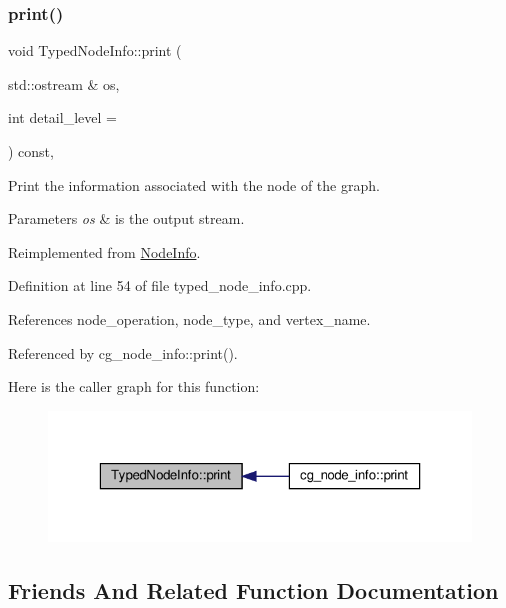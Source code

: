 \subsubsection{\texorpdfstring{print()}{print()}}
{\footnotesize\ttfamily void Typed\+Node\+Info\+::print (\begin{DoxyParamCaption}\item[{std\+::ostream \&}]{os,  }\item[{int}]{detail\+\_\+level = {} }\end{DoxyParamCaption}) const\hspace{0.3cm}{\ttfamily [override]}, {\ttfamily [virtual]}}



Print the information associated with the node of the graph. 


\begin{DoxyParams}{Parameters}
{\em os} & is the output stream. \\
\hline
\end{DoxyParams}


Reimplemented from \hyperlink{structNodeInfo_adacfeaff90018a35bde5211edbbd1114}{Node\+Info}.



Definition at line 54 of file typed\+\_\+node\+\_\+info.\+cpp.



References node\+\_\+operation, node\+\_\+type, and vertex\+\_\+name.



Referenced by cg\+\_\+node\+\_\+info\+::print().

Here is the caller graph for this function\+:
\nopagebreak
\begin{figure}[H]
\begin{center}
\leavevmode
\includegraphics[width=323pt]{db/d12/structTypedNodeInfo_ad2e8b00442b9215ece3d7b2cf2495aef_icgraph}
\end{center}
\end{figure}


\subsection{Friends And Related Function Documentation}
\mbox{\label{structTypedNodeInfo_a44b5e6659c6a4881d73f29eb5debbf6f}} 
